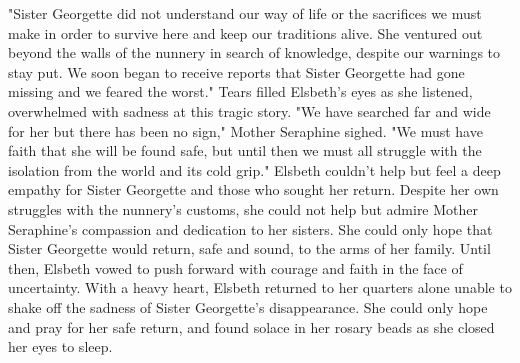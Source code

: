 \documentclass[11pt]{article}
\begin{document}
"Sister Georgette did not understand our way of life or the sacrifices we must make in order to survive here and keep our traditions alive. She ventured out beyond the walls of the nunnery in search of knowledge, despite our warnings to stay put. We soon began to receive reports that Sister Georgette had gone missing and we feared the worst."
Tears filled Elsbeth's eyes as she listened, overwhelmed with sadness at this tragic story. "We have searched far and wide for her but there has been no sign," Mother Seraphine sighed. "We must have faith that she will be found safe, but until then we must all struggle with the isolation from the world and its cold grip."
Elsbeth couldn't help but feel a deep empathy for Sister Georgette and those who sought her return. Despite her own struggles with the nunnery's customs, she could not help but admire Mother Seraphine's compassion and dedication to her sisters. She could only hope that Sister Georgette would return, safe and sound, to the arms of her family. Until then, Elsbeth vowed to push forward with courage and faith in the face of uncertainty.
With a heavy heart, Elsbeth returned to her quarters alone unable to shake off the sadness of Sister Georgette's disappearance. She could only hope and pray for her safe return, and found solace in her rosary beads as she closed her eyes to sleep.
\end{document}
